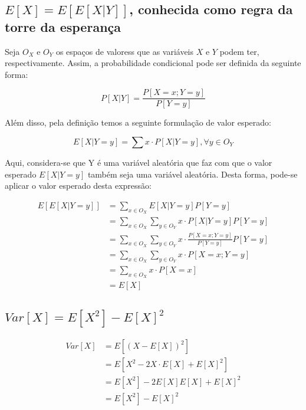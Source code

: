\documentclass[a4paper]{article}
\begin{document}
\subsection{$E[X] = E[E[X|Y]]$, conhecida como regra da torre da esperança}

Seja $O_X$ e $O_Y$ os espaços de valoress que as variáveis $X$ e $Y$ podem ter, respectivamente. Assim, a probabilidade condicional pode ser definida da seguinte forma: 

$$P[X|Y] = \frac{P[X = x; Y = y]}{P[Y = y]}$$

Além disso, pela definição temos a seguinte formulação de valor esperado: 

$$E[X| Y = y] = \sum x \cdot P[X|Y = y], \forall y \in O_Y$$

Aqui, considera-se que Y é uma variável aleatória que faz com que o valor esperado $E[X| Y = y]$ também seja uma variável aleatória. Desta forma, pode-se aplicar o valor esperado desta expressão: 

\begin{equation*}
    \begin{split}
        E[E[X| Y = y]] &= \sum_{x \in O_X} E[X| Y = y]P[Y = y] \\
            &= \sum_{x \in O_X} \sum_{y \in O_Y} x \cdot P[X|Y = y]P[Y = y]\\
            &= \sum_{x \in O_X} \sum_{y \in O_Y} x \cdot \frac{P[X = x; Y = y]}{P[Y = y]}P[Y = y] \\
            &= \sum_{x \in O_X} \sum_{y \in O_Y} x \cdot P[X = x; Y = y] \\
            &= \sum_{x \in O_X} x \cdot P[X = x] \\
            &= E[X]
    \end{split}
\end{equation*}

\subsection{$Var[X] = E[X^2]-E[X]^2$}

\begin{equation*}
    \begin{split}
        Var[X] &= E[(X-E[X])^2] \\
            &= E[X^2 - 2X\cdot E[X] + E[X]^2] \\
            &= E[X^2] -2E[X]E[X] + E[X]^2 \\
            &= E[X^2] - E[X]^2
    \end{split}
\end{equation*}
\end{document}
